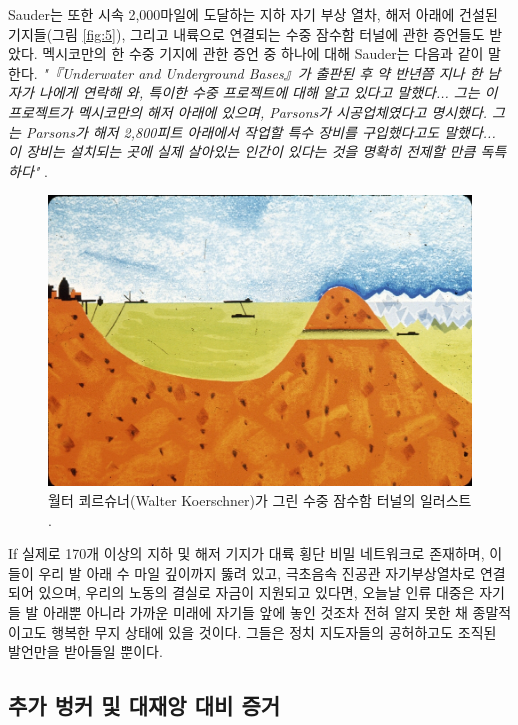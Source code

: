 \documentclass[10pt,twocolumn,letterpaper]{article}
\begin{document}
Sauder는 또한 시속 2,000마일에 도달하는 지하 자기 부상 열차, 해저 아래에 건설된 기지들(그림 \ref{fig:5}), 그리고 내륙으로 연결되는 수중 잠수함 터널에 관한 증언들도 받았다. 멕시코만의 한 수중 기지에 관한 증언 중 하나에 대해 Sauder는 다음과 같이 말한다. \textit{"『Underwater and Underground Bases』가 출판된 후 약 반년쯤 지나 한 남자가 나에게 연락해 와, 특이한 수중 프로젝트에 대해 알고 있다고 말했다... 그는 이 프로젝트가 멕시코만의 해저 아래에 있으며, Parsons가 시공업체였다고 명시했다. 그는 Parsons가 해저 2,800피트 아래에서 작업할 특수 장비를 구입했다고도 말했다... 이 장비는 설치되는 곳에 실제 살아있는 인간이 있다는 것을 명확히 전제할 만큼 독특하다"} \cite{22}.

\begin{figure}[t]
\begin{center}
   \includegraphics[width=1\linewidth]{sub.jpg}
\end{center}
   \caption{월터 쾨르슈너(Walter Koerschner)가 그린 수중 잠수함 터널의 일러스트 \cite{22,23}.}
\label{fig:6}
\label{fig:onecol}
\end{figure}
If 실제로 170개 이상의 지하 및 해저 기지가 대륙 횡단 비밀 네트워크로 존재하며, 이들이 우리 발 아래 수 마일 깊이까지 뚫려 있고, 극초음속 진공관 자기부상열차로 연결되어 있으며, 우리의 노동의 결실로 자금이 지원되고 있다면, 오늘날 인류 대중은 자기들 발 아래뿐 아니라 가까운 미래에 자기들 앞에 놓인 것조차 전혀 알지 못한 채 종말적이고도 행복한 무지 상태에 있을 것이다. 그들은 정치 지도자들의 공허하고도 조직된 발언만을 받아들일 뿐이다.

\subsection{추가 벙커 및 대재앙 대비 증거}
\end{document}
